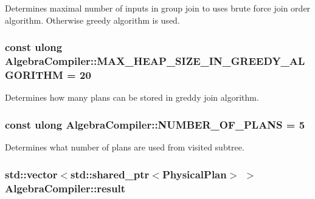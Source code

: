 Determines maximal number of inputs in group join to uses brute force join order algorithm. Otherwise greedy algorithm is used. \hypertarget{class_algebra_compiler_aa67a35b24af1850ef0294e353f8a7184}{
\subsubsection[{M\+A\+X\+\_\+\+H\+E\+A\+P\+\_\+\+S\+I\+Z\+E\+\_\+\+I\+N\+\_\+\+G\+R\+E\+E\+D\+Y\+\_\+\+A\+L\+G\+O\+R\+I\+T\+H\+M}]{\setlength{\rightskip}{0pt plus 5cm}const ulong Algebra\+Compiler\+::\+M\+A\+X\+\_\+\+H\+E\+A\+P\+\_\+\+S\+I\+Z\+E\+\_\+\+I\+N\+\_\+\+G\+R\+E\+E\+D\+Y\+\_\+\+A\+L\+G\+O\+R\+I\+T\+H\+M = 20\hspace{0.3cm}{\ttfamily [static]}}}\label{class_algebra_compiler_aa67a35b24af1850ef0294e353f8a7184}
Determines how many plans can be stored in greddy join algorithm. \hypertarget{class_algebra_compiler_ab1a348c2daa3ca8f805f7cec2b35e29d}{
\subsubsection[{N\+U\+M\+B\+E\+R\+\_\+\+O\+F\+\_\+\+P\+L\+A\+N\+S}]{\setlength{\rightskip}{0pt plus 5cm}const ulong Algebra\+Compiler\+::\+N\+U\+M\+B\+E\+R\+\_\+\+O\+F\+\_\+\+P\+L\+A\+N\+S = 5\hspace{0.3cm}{\ttfamily [static]}}}\label{class_algebra_compiler_ab1a348c2daa3ca8f805f7cec2b35e29d}
Determines what number of plans are used from visited subtree. \hypertarget{class_algebra_compiler_acf3202bd193e4552a1d4fadb6d0b356c}{
\subsubsection[{result}]{\setlength{\rightskip}{0pt plus 5cm}std\+::vector$<$std\+::shared\+\_\+ptr$<${\bf Physical\+Plan}$>$ $>$ Algebra\+Compiler\+::result}}\label{class_algebra_compiler_acf3202bd193e4552a1d4fadb6d0b356c}
